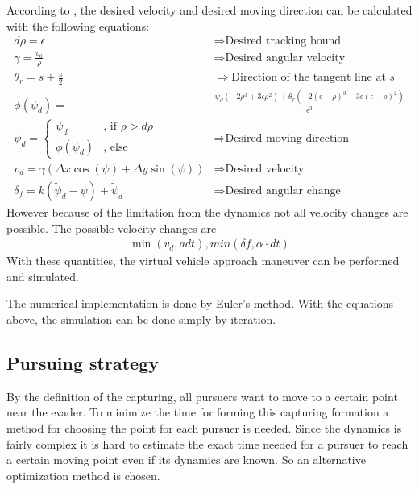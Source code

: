 \documentclass[ebook,11pt] {kth-mag}
\begin{document}
According to \cite{vva}, the desired velocity and desired moving direction can be calculated with the following equations:
\begin{equation}
\begin{split}
d\rho = \epsilon & \Rightarrow \textrm{Desired tracking bound} \\
\gamma = \frac{v_0}{\rho} & \Rightarrow \textrm{Desired angular velocity} \\
\theta_r = s + \frac{\pi}{2} & \Rightarrow \text{Direction of the tangent line at $s$} \\
\phi(\psi_d) = & \frac{\psi_d(-2\rho^3+3\epsilon\rho^2)+
     \theta_r(-2(\epsilon-\rho)^3+3\epsilon(\epsilon-\rho)^2)}{\epsilon^3} \\
\widetilde{\psi}_d = 
\begin{cases}
    \psi_d  & \textrm{, if } \rho > d\rho \\
    \phi(\psi_d) & \textrm{, else}
\end{cases}
& \Rightarrow \textrm{Desired moving direction} \\
v_{d} = \gamma (\Delta x  \cos(\psi) + \Delta y  \sin(\psi)) & \Rightarrow \textrm{Desired velocity} \\
\delta_f = k(\widetilde{\psi}_d-\psi)+ \widetilde{\psi}_d & \Rightarrow \textrm{Desired angular change} 
\end{split}
\end{equation}
However because of the limitation from the dynamics not all velocity changes are possible. 
The possible velocity changes are 
\begin{equation}
\begin{split}
\min(v_d, a dt), min(\delta f , \alpha \cdot dt)
\end{split}
\end{equation}
With these quantities, the virtual vehicle approach maneuver can be performed and simulated. 

The numerical implementation is done by Euler's method. With the equations above, the simulation can be done simply by iteration. 

\subsection{Pursuing strategy}
By the definition of the capturing, all pursuers want to move to a certain point near the evader. 
To minimize the time for forming this capturing formation a method for choosing the point for each pursuer is needed. Since the dynamics is fairly complex it is hard to estimate the exact time needed for a pursuer to reach a certain moving point even if its dynamics are known. 
So an alternative optimization method is chosen.
\end{document}
